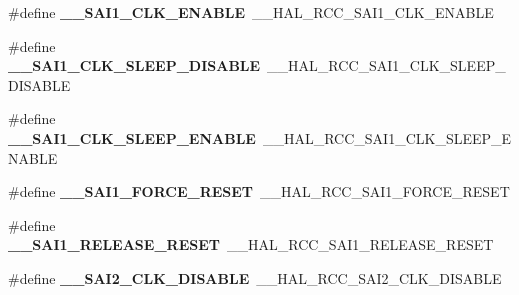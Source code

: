 \begin{DoxyCompactItemize}
\item 
\mbox{\label{group___h_a_l___r_c_c___aliased_gafa304625058568d2853a58c18d3a57f0}} 
\#define {\bfseries \+\_\+\+\_\+\+S\+A\+I1\+\_\+\+C\+L\+K\+\_\+\+E\+N\+A\+B\+LE}~\+\_\+\+\_\+\+H\+A\+L\+\_\+\+R\+C\+C\+\_\+\+S\+A\+I1\+\_\+\+C\+L\+K\+\_\+\+E\+N\+A\+B\+LE
\item 
\mbox{\label{group___h_a_l___r_c_c___aliased_gad86ef4770d1d2e32c8395ff14dd9fb3e}} 
\#define {\bfseries \+\_\+\+\_\+\+S\+A\+I1\+\_\+\+C\+L\+K\+\_\+\+S\+L\+E\+E\+P\+\_\+\+D\+I\+S\+A\+B\+LE}~\+\_\+\+\_\+\+H\+A\+L\+\_\+\+R\+C\+C\+\_\+\+S\+A\+I1\+\_\+\+C\+L\+K\+\_\+\+S\+L\+E\+E\+P\+\_\+\+D\+I\+S\+A\+B\+LE
\item 
\mbox{\label{group___h_a_l___r_c_c___aliased_ga930f613f28d57aaec974d8a0e611c373}} 
\#define {\bfseries \+\_\+\+\_\+\+S\+A\+I1\+\_\+\+C\+L\+K\+\_\+\+S\+L\+E\+E\+P\+\_\+\+E\+N\+A\+B\+LE}~\+\_\+\+\_\+\+H\+A\+L\+\_\+\+R\+C\+C\+\_\+\+S\+A\+I1\+\_\+\+C\+L\+K\+\_\+\+S\+L\+E\+E\+P\+\_\+\+E\+N\+A\+B\+LE
\item 
\mbox{\label{group___h_a_l___r_c_c___aliased_ga6fa8759253db7e8a4feaf7e4f5e40a3e}} 
\#define {\bfseries \+\_\+\+\_\+\+S\+A\+I1\+\_\+\+F\+O\+R\+C\+E\+\_\+\+R\+E\+S\+ET}~\+\_\+\+\_\+\+H\+A\+L\+\_\+\+R\+C\+C\+\_\+\+S\+A\+I1\+\_\+\+F\+O\+R\+C\+E\+\_\+\+R\+E\+S\+ET
\item 
\mbox{\label{group___h_a_l___r_c_c___aliased_ga9348bdfef0e79a335e4c4c00cdd77e18}} 
\#define {\bfseries \+\_\+\+\_\+\+S\+A\+I1\+\_\+\+R\+E\+L\+E\+A\+S\+E\+\_\+\+R\+E\+S\+ET}~\+\_\+\+\_\+\+H\+A\+L\+\_\+\+R\+C\+C\+\_\+\+S\+A\+I1\+\_\+\+R\+E\+L\+E\+A\+S\+E\+\_\+\+R\+E\+S\+ET
\item 
\mbox{\label{group___h_a_l___r_c_c___aliased_gadec8489576c1a83913f620c66517bff6}} 
\#define {\bfseries \+\_\+\+\_\+\+S\+A\+I2\+\_\+\+C\+L\+K\+\_\+\+D\+I\+S\+A\+B\+LE}~\+\_\+\+\_\+\+H\+A\+L\+\_\+\+R\+C\+C\+\_\+\+S\+A\+I2\+\_\+\+C\+L\+K\+\_\+\+D\+I\+S\+A\+B\+LE
\item 
\mbox{\label{group___h_a_l___r_c_c___aliased_ga918b0825bcbcaadad3cf40c7127c8322}} 

\end{DoxyCompactItemize}
